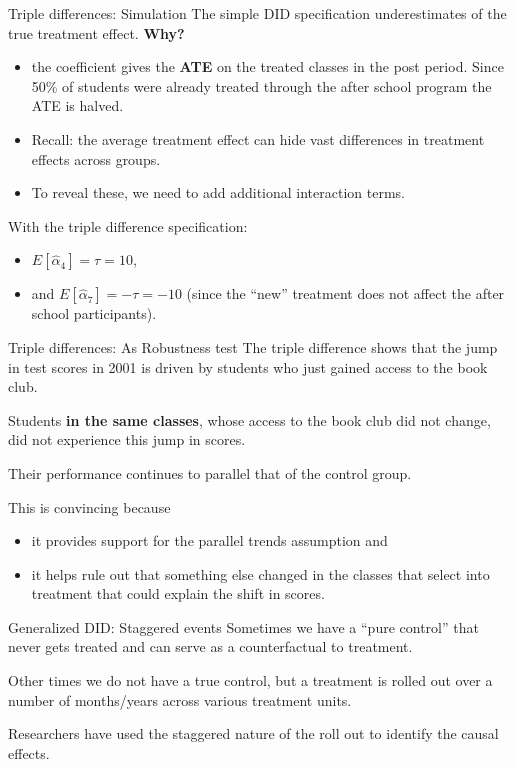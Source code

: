 \documentclass[
  ignorenonframetext,
]{beamer}
\begin{document}
\begin{frame}{Triple differences: Simulation}
\protect\hypertarget{triple-differences-simulation-5}{}
The simple DID specification underestimates of the true treatment
effect. \textbf{Why?}

\begin{itemize}
\item
  the coefficient gives the \textbf{ATE} on the treated classes in the
  post period. Since 50\% of students were already treated through the
  after school program the ATE is halved.
\item
  Recall: the average treatment effect can hide vast differences in
  treatment effects across groups.
\item
  To reveal these, we need to add additional interaction terms.
\end{itemize}

With the triple difference specification:

\begin{itemize}
\item
  \(E[\hat{\alpha}_4]=\tau=10\),
\item
  and \(E[\hat{\alpha}_7]=-\tau=-10\) (since the ``new'' treatment does
  not affect the after school participants).
\end{itemize}
\end{frame}

\begin{frame}{Triple differences: As Robustness test}
\protect\hypertarget{triple-differences-as-robustness-test}{}
The triple difference shows that the jump in test scores in 2001 is
driven by students who just gained access to the book club.

Students \textbf{in the same classes}, whose access to the book club did
not change, did not experience this jump in scores.

Their performance continues to parallel that of the control group.

This is convincing because

\begin{itemize}
\item
  it provides support for the parallel trends assumption and
\item
  it helps rule out that something else changed in the classes that
  select into treatment that could explain the shift in scores.
\end{itemize}
\end{frame}

\begin{frame}{Generalized DID: Staggered events}
\protect\hypertarget{generalized-did-staggered-events}{}
Sometimes we have a ``pure control'' that never gets treated and can
serve as a counterfactual to treatment.

Other times we do not have a true control, but a treatment is rolled out
over a number of months/years across various treatment units.

Researchers have used the staggered nature of the roll out to identify
the causal effects.
\end{frame}
\end{document}
